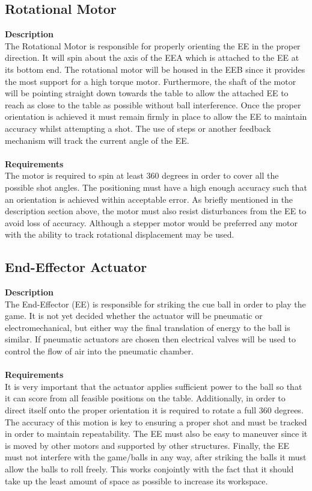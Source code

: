 \documentclass[titlepage]{article}
\begin{document}
\subsection{Rotational Motor}
\textbf{Description}\\
The Rotational Motor is responsible for properly orienting the EE in the proper direction. It will spin about the axis of the EEA which is attached to the EE at its bottom end. The rotational motor will be housed in the EEB since it provides the most support for a high torque motor. Furthermore, the shaft of the motor will be pointing straight down towards the table to allow the attached EE to reach as close to the table as possible without ball interference. Once the proper orientation is achieved it must remain firmly in place to allow the EE to maintain accuracy whilst attempting a shot. The use of steps or another feedback mechanism will track the current angle of the EE.\\\\
\textbf{Requirements}\\
The motor is required to spin at least 360 degrees in order to cover all the possible shot angles. The positioning must have a high enough accuracy such that an orientation is achieved within acceptable error. As briefly mentioned in the description section above, the motor must also resist disturbances from the EE to avoid loss of accuracy. Although a stepper motor would be preferred any motor with the ability to track rotational displacement may be used.

\subsection{End-Effector Actuator}
\textbf{Description}\\
The End-Effector (EE) is responsible for striking the cue ball in order to play the game. It is not yet decided whether the actuator will be pneumatic or electromechanical, but either way the final translation of energy to the ball is similar. If pneumatic actuators are chosen then electrical valves will be used to control the flow of air into the pneumatic chamber.\\\\
\textbf{Requirements}\\
It is very important that the actuator applies sufficient power to the ball so that it can score from all feasible positions on the table. Additionally, in order to direct itself onto the proper orientation it is required to rotate a full 360 degrees. The accuracy of this motion is key to ensuring a proper shot and must be tracked in order to maintain repeatability. The EE must also be easy to maneuver since it is moved by other motors and supported by other structures. Finally, the EE must not interfere with the game/balls in any way, after striking the balls it must allow the balls to roll freely. This works conjointly with the fact that it should take up the least amount of space as possible to increase its workspace.
\end{document}
